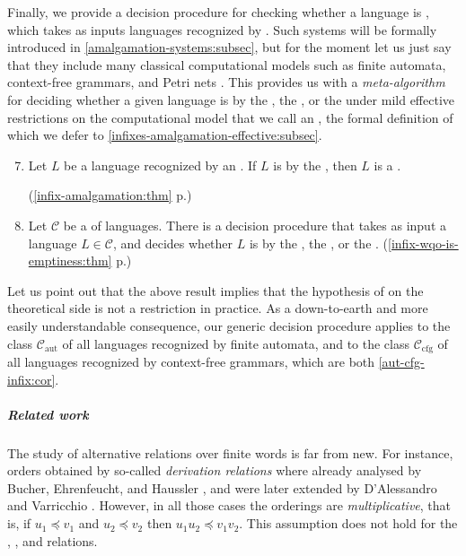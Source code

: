 \AP Finally, we provide a decision procedure for checking whether a language is
, which takes as inputs languages recognized by
 \cite{ASZZ24}. Such systems will be formally
introduced in
\cref{amalgamation-systems:subsec}, but
for the moment let us just say that they include many classical computational
models such as finite automata, context-free grammars, and Petri nets
\cite{ASZZ24}. This provides us with a \emph{meta-algorithm} for deciding
whether a given language is  by the , the , or the  under mild
effective restrictions on the computational model that we call an , the formal definition of which we defer to
\cref{infixes-amalgamation-effective:subsec}.

{
\renewcommand{\labelenumi}{R\arabic{enumi}}
\begin{enumerate}
    \setcounter{enumi}{6}
    \item 
        Let $L$ be a language recognized by an .
        If $L$ is  by the ,
        then $L$ is a .

        \hfill (\cref{infix-amalgamation:thm} p.\pageref{infix-amalgamation:thm})
    \item 
        Let $\mathcal{C}$ be a  of languages.
        There is a decision procedure that takes as input a language $L \in \mathcal{C}$,
        and decides whether $L$ is  by the ,
        the , or the . 
        \hfill (\cref{infix-wqo-is-emptiness:thm} p.\pageref{infix-wqo-is-emptiness:thm})
\end{enumerate}
}
Let us point out that the above result implies that the hypothesis of
 on the theoretical side is not a restriction in
practice. As a down-to-earth and more easily understandable 
consequence,
our generic decision procedure applies 
to the class $\mathcal{C}_\text{aut}$ of all languages recognized by finite automata,
and to the class $\mathcal{C}_\text{cfg}$ of all languages recognized by context-free grammars,
which are both  \cref{aut-cfg-infix:cor}.


\subparagraph{Related work} The study of alternative 
relations over finite words is far from new. For instance, orders obtained by
so-called \emph{derivation relations} where already analysed by Bucher,
Ehrenfeucht, and Haussler \cite{BUEUD85}, and were later extended by
D'Alessandro and Varricchio \cite{ALVA03,ALVA06}. However, in all those cases
the orderings are \emph{multiplicative}, that is, if $u_1 \preceq v_1$ and $u_2
\preceq v_2$ then $u_1u_2 \preceq v_1v_2$. This assumption does not hold for
the , , and  relations.


